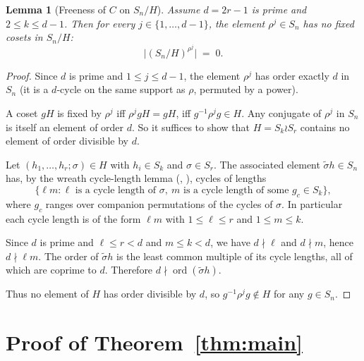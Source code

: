 \documentclass[11pt]{article}
\newtheorem{lemma}[theorem]{Lemma}
\theoremstyle{definition}
\theoremstyle{remark}
\begin{document}
\begin{lemma}[Freeness of $C$ on $S_n / H$]\label{lem:free}
Assume $d = 2r - 1$ is prime and $2 \le k \le d - 1$.  Then for every $j \in \{1, \ldots, d-1\}$, the element $\rho^j \in S_n$ has no fixed cosets in $S_n / H$:
\[
\bigl| (S_n / H)^{\rho^j}\bigr| \;=\; 0.
\]
\end{lemma}

\begin{proof}
Since $d$ is prime and $1 \le j \le d - 1$, the element $\rho^j$ has order exactly $d$ in $S_n$ (it is a $d$-cycle on the same support as $\rho$, permuted by a power).

A coset $gH$ is fixed by $\rho^j$ iff $\rho^j gH = gH$, iff $g^{-1}\rho^j g \in H$.  Any conjugate of $\rho^j$ in $S_n$ is itself an element of order $d$.  So it suffices to show that $H = S_k \wr S_r$ contains no element of order divisible by $d$.

Let $(h_1, \ldots, h_r; \sigma) \in H$ with $h_i \in S_k$ and $\sigma \in S_r$.  The associated element $\tilde\sigma h \in S_n$ has, by the wreath cycle-length lemma (\cite[Lemma~4.10]{Macdonald}, \cite[Thm.~4.2.8]{JamesKerber}), cycles of lengths
\[
\bigl\{ \ell m : \ell \text{ is a cycle length of } \sigma,\ m \text{ is a cycle length of some }g_c \in S_k\bigr\},
\]
where $g_c$ ranges over companion permutations of the cycles of $\sigma$.  In particular each cycle length is of the form $\ell m$ with $1 \le \ell \le r$ and $1 \le m \le k$.

Since $d$ is prime and $\ell \le r < d$ and $m \le k < d$, we have $d \nmid \ell$ and $d \nmid m$, hence $d \nmid \ell m$.  The order of $\tilde\sigma h$ is the least common multiple of its cycle lengths, all of which are coprime to $d$.  Therefore $d \nmid \operatorname{ord}(\tilde\sigma h)$.

Thus no element of $H$ has order divisible by $d$, so $g^{-1}\rho^j g \notin H$ for any $g \in S_n$.
\end{proof}

\section{Proof of Theorem~\ref{thm:main}}
\end{document}
